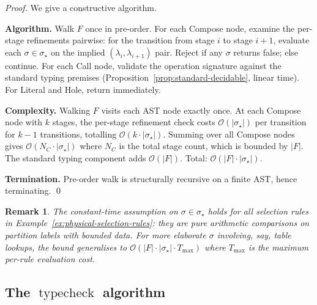 \documentclass[twocolumn,11pt,a4paper]{article}
\newtheorem{remark}[theorem]{Remark}
\DeclareMathOperator{\typecheck}{typecheck}
\newcommand{\Sel}{\sigma}
\newcommand{\Frag}{F}
\begin{document}
\begin{proof}
We give a constructive algorithm.

\textbf{Algorithm.} Walk $\Frag$ once in pre-order. For each Compose node, examine the per-stage refinements pairwise: for the transition from stage $i$ to stage $i+1$, evaluate each $\Sel \in \Sel_\star$ on the implied $(\lambda_i, \lambda_{i+1})$ pair. Reject if any $\Sel$ returns false; else continue. For each Call node, validate the operation signature against the standard typing premises (Proposition~\ref{prop:standard-decidable}, linear time). For Literal and Hole, return immediately.

\textbf{Complexity.} Walking $\Frag$ visits each AST node exactly once. At each Compose node with $k$ stages, the per-stage refinement check costs $\mathcal{O}(|\Sel_\star|)$ per transition for $k - 1$ transitions, totalling $\mathcal{O}(k \cdot |\Sel_\star|)$. Summing over all Compose nodes gives $\mathcal{O}(N_C \cdot |\Sel_\star|)$ where $N_C$ is the total stage count, which is bounded by $|\Frag|$. The standard typing component adds $\mathcal{O}(|\Frag|)$. Total: $\mathcal{O}(|\Frag| \cdot |\Sel_\star|)$.

\textbf{Termination.} Pre-order walk is structurally recursive on a finite AST, hence terminating. \qed
\end{proof}

\begin{remark}
The constant-time assumption on $\Sel \in \Sel_\star$ holds for all selection rules in Example~\ref{ex:physical-selection-rules}: they are pure arithmetic comparisons on partition labels with bounded data. For more elaborate $\Sel$ involving, say, table lookups, the bound generalises to $\mathcal{O}(|\Frag| \cdot |\Sel_\star| \cdot T_{\mathrm{max}})$ where $T_{\mathrm{max}}$ is the maximum per-rule evaluation cost.
\end{remark}

\subsection{The $\typecheck$ algorithm}
\end{document}
